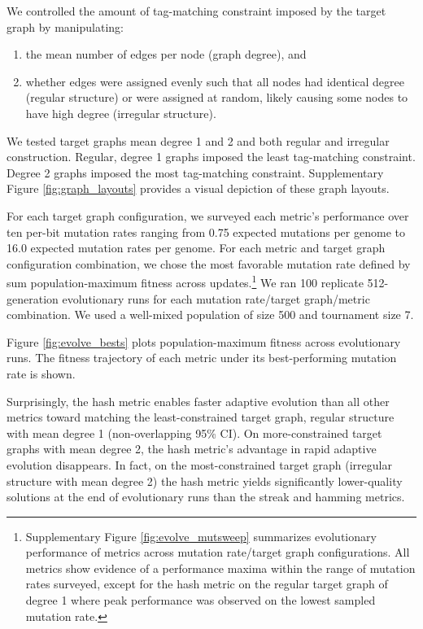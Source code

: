 We controlled the amount of tag-matching constraint imposed by the target graph by manipulating:
\begin{enumerate}
  \item the mean number of edges per node (graph degree), and
  \item whether edges were assigned evenly such that all nodes had identical degree (regular structure) or were assigned at random, likely causing some nodes to have high degree (irregular structure).
\end{enumerate}
We tested target graphs mean degree 1 and 2 and both regular and irregular construction.
Regular, degree 1 graphs imposed the least tag-matching constraint.
Degree 2 graphs imposed the most tag-matching constraint.
Supplementary Figure \ref{fig:graph_layouts} provides a visual depiction of these graph layouts.

For each target graph configuration, we surveyed each metric's performance over ten per-bit mutation rates ranging from 0.75 expected mutations per genome to 16.0 expected mutation rates per genome.
For each metric and target graph configuration combination, we chose the most favorable mutation rate defined by sum population-maximum fitness across updates.\footnote{
Supplementary Figure \ref{fig:evolve_mutsweep} summarizes evolutionary performance of metrics across mutation rate/target graph configurations.
All metrics show evidence of a performance maxima within the range of mutation rates surveyed, except for the hash metric on the regular target graph of degree 1 where peak performance was observed on the lowest sampled mutation rate.
}
We ran 100 replicate 512-generation evolutionary runs for each mutation rate/target graph/metric combination.
We used a well-mixed population of size 500 and tournament size 7.

Figure \ref{fig:evolve_bests} plots population-maximum fitness across evolutionary runs.
The fitness trajectory of each metric under its best-performing mutation rate is shown.

Surprisingly, the hash metric enables faster adaptive evolution than all other metrics toward matching the least-constrained target graph, regular structure with mean degree 1 (non-overlapping 95\% CI).
On more-constrained target graphs with mean degree 2, the hash metric's advantage in rapid adaptive evolution disappears.
In fact, on the most-constrained target graph (irregular structure with mean degree 2) the hash metric yields significantly lower-quality solutions at the end of evolutionary runs than the streak and hamming metrics.


